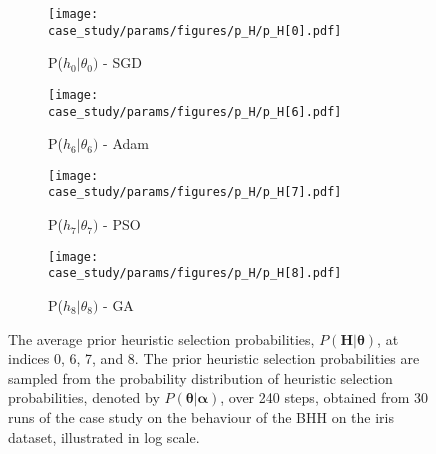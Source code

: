 \begin{figure}[htb]
      \begin{subfigure}{0.5\textwidth}
            \centering
            \texttt{[image: case\_study/params/figures/p\_H/p\_H[0].pdf]}
            \caption{P($h_{0} \vert \theta_{0})$ - \acs{SGD}}
            \label{fig:results:case_study:p_H:0}
      \end{subfigure}
      \begin{subfigure}{0.5\textwidth}
            \centering
            \texttt{[image: case\_study/params/figures/p\_H/p\_H[6].pdf]}
            \caption{P($h_{6} \vert \theta_{6})$ - \acs{Adam}}
            \label{fig:results:case_study:p_H:6}
      \end{subfigure}
      \par\bigskip
      \begin{subfigure}{0.5\textwidth}
            \centering
            \texttt{[image: case\_study/params/figures/p\_H/p\_H[7].pdf]}
            \caption{P($h_{7} \vert \theta_{7})$ - \acs{PSO}}
            \label{fig:results:case_study:p_H:7}
      \end{subfigure}
      \begin{subfigure}{0.5\textwidth}
            \centering
            \texttt{[image: case\_study/params/figures/p\_H/p\_H[8].pdf]}
            \caption{P($h_{8} \vert \theta_{8})$ - \acs{GA}}
            \label{fig:results:case_study:p_H:8}
      \end{subfigure}
      \par\bigskip
      \caption{The average prior heuristic selection probabilities, $P(\boldsymbol{H} \vert \boldsymbol{\theta})$, at indices 0, 6, 7, and 8. The prior heuristic selection probabilities are sampled from the probability distribution of heuristic selection probabilities, denoted by $P(\boldsymbol{\theta} \vert \boldsymbol{\alpha})$, over 240 steps, obtained from 30 runs of the case study on the behaviour of the \acs{BHH} on the iris dataset, illustrated in log scale.}
      \label{fig:results:case_study:p_H}
\end{figure}

